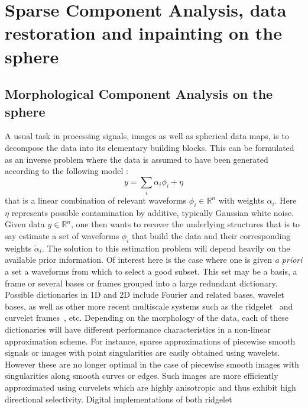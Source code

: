 \chapter{Sparse Component Analysis, data restoration and inpainting on the sphere}
\label{ch_sca_datarest}

\section{Morphological Component Analysis on the sphere}

A usual task  in processing signals, images as well as spherical data maps, is to decompose the data 
into its elementary building blocks. This can be formulated as an inverse problem where the data is 
assumed to have been generated according to the following model : 
\begin{equation}
 y = \sum_{i} \alpha_i \phi_i + \eta
\end{equation}
that is a linear combination of relevant waveforms $\phi_i \in \mathbb{R}^n$ with weights $\alpha_i$. 
Here $\eta$ represents possible contamination by additive, typically Gaussian white noise. Given data 
$y\in \mathbb{R}^n$, one then wants to recover the underlying structures that is to say estimate a set 
of waveforms $\phi_i$ that build the data and their corresponding weights $\tilde{\alpha}_i$. The solution 
to this estimation problem will depend heavily on the available prior information. Of interest here is 
the case where one is given \emph{a priori} a set a waveforms from which to select a good subset. This set 
may be a basis, a frame or several bases or frames grouped into a large redundant dictionary.\\
%
Possible dictionaries in 1D and 2D include Fourier and related bases, wavelet bases, as well as 
other more recent multiscale systems such as the ridgelet~\cite{cur:candes99_1} and curvelet 
frames~\cite{cur:donoho99,starck:sta01_3}, etc. Depending on the morphology of the data, each of 
these dictionaries will have different performance characteristics 
in a non-linear approximation scheme. For instance, sparse approximations of piecewise smooth 
signals or images with point singularities are easily obtained using wavelets. However these 
are no longer optimal in the case of piecewise smooth images with singularities along smooth 
curves or edges. Such images are more efficiently approximated using curvelets which are highly 
anisotropic and thus exhibit high directional selectivity. Digital implementations of both ridgelet 
